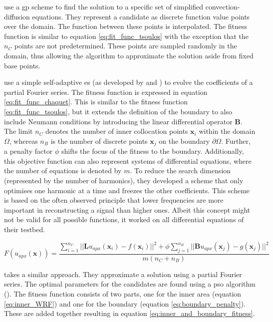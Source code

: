 \documentclass[./\jobname.tex]{subfiles}
\begin{document}
\cite{howard_genetic_2011} use a \gls{gp} scheme to find the solution to a specific set of simplified convection-diffusion equations. They represent a candidate as discrete function value points over the domain. The function between these points is interpolated. The fitness function is similar to equation \eqref{eq:fit_func_tsoulos} with the exception that the $n_C$ points are not predetermined. These points are sampled randomly in the domain, thus allowing the algorithm to approximate the solution aside from fixed base points. 

\cite{chaquet_solving_2012} use a simple self-adaptive \gls{es} (as developed by \cite{schwefel_evolutionsstrategien_1977} and \cite{rechenberg_evolutionsstrategien_1978}) to evolve the coefficients of a partial Fourier series. The fitness function is expressed in equation \eqref{eq:fit_func_chaquet}. This is similar to the fitness function \ref{eq:fit_func_tsoulos}, but it extends the definition of the boundary to also include Neumann conditions by introducing the linear differential operator $\mathbf{B}$. The limit $n_C$ denotes the number of inner collocation points $\mathbf{x}_i$ within the domain $\Omega$, whereas $n_B$ is the number of discrete points $\mathbf{x}_j$ on the boundary $\partial \Omega$. Further, a penalty factor $\phi$ shifts the focus of the fitness to the boundary. Additionally, this objective function can also represent systems of differential equations, where the number of equations is denoted by $m$. To reduce the search dimension (represented by the number of harmonics), they developed a scheme that only optimises one harmonic at a time and freezes the other coefficients. This scheme is based on the often observed principle that lower frequencies are more important in reconstructing a signal than higher ones. Albeit this concept might not be valid for all possible functions, it worked on all differential equations of their testbed. 

\begin{equation}
\label{eq:fit_func_chaquet_2012}
F(u_{apx}(\mathbf{x})) = \frac{\sum_{i=1}^{n_C} || \mathbf{L}u_{apx}(\mathbf{x}_i) - f(\mathbf{x}_i)||^2 + \phi \sum_{j=1}^{n_B} || \mathbf{B}u_{apx}(\mathbf{x}_j) - g(\mathbf{x}_j)||^2}{m (n_C + n_B)}  
\end{equation}

\cite{babaei_general_2013} takes a similar approach. They approximate a solution using a partial Fourier series. The optimal parameters for the candidates are found using a \gls{pso} algorithm (\cite{kennedy_particle_1995}). The fitness function consists of two parts, one for the inner area (equation \eqref{eq:inner_WRF}) and one for the boundary (equation \eqref{eq:boundary_penalty}). These are added together resulting in equation \eqref{eq:inner_and_boundary_fitness}.
\end{document}
